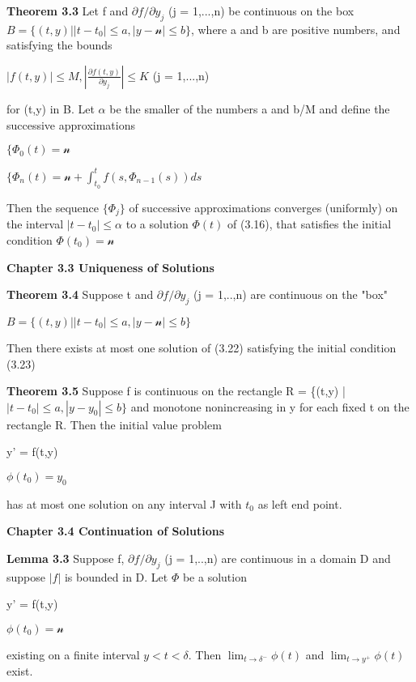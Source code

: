 \documentclass{article}
\newcommand\tab[1][1cm]{\hspace*{#1}}
\begin{document}
\textbf {Theorem 3.3} Let f and $\partial f / \partial y_j$ (j = 1,...,n) be 
continuous on the box $B = \{ (t,y) | |t-t_0| \leq a, |y-\mathcal{n}| \leq b \}$,
where a and b are positive numbers, and satisfying the bounds
\begin{center}
$|f(t,y)| \leq M, |\frac{\partial f(t,y)}{\partial y_j} | \leq K$ \tab (j = 1,...,n)
\end{center}
for (t,y) in B. Let $\alpha$ be the smaller of the numbers a and b/M and define
the successive approximations
\begin{center}
$ \{ \Phi_0(t) = \mathscr{n}$
\end{center}
\begin{center}
$ \{ \Phi_n(t) = \mathscr{n} + \int_{t_0}^t f(s, \Phi_{n-1} (s)) ds$
\end{center}
Then the sequence $\{ \Phi_j \}$ of successive approximations converges 
(uniformly) on the interval $|t-t_0| \leq \alpha$ to a solution $\Phi(t)$ of (3.16), 
that satisfies the initial condition $\Phi(t_0) = \mathscr{n}$

\textbf {Chapter 3.3 Uniqueness of Solutions}

\textbf {Theorem 3.4} Suppose t and $\partial f / \partial y_j$ (j = 1,..,n) are continuous on the "box"
\begin{center}
$B = \{(t,y) | |t-t_0| \leq a, |y-\mathscr{n}| \leq b \}$
\end{center}
Then there exists at most one solution of (3.22) satisfying the initial condition (3.23)

\textbf {Theorem 3.5} Suppose f is continuous on the rectangle R = \{(t,y) | $ |t-t_0| \leq a, |y-y_0| \leq b \}$ and monotone nonincreasing in y for each fixed t on the rectangle R. Then the initial value problem
\begin{center}
y' = f(t,y)
\end{center}
\begin{center}
$\phi(t_0) = y_0$
\end{center}
has at most one solution on any interval J with $t_0$ as left end point.

\textbf {Chapter 3.4 Continuation of Solutions}

\textbf {Lemma 3.3} Suppose f, $\partial f / \partial y_j$ (j = 1,..,n) are continuous in a domain D and suppose $|f|$ is bounded in D. Let $\Phi$ be a solution
\begin{center}
y' = f(t,y)
\end{center}
\begin{center}
$\phi(t_0) = \mathscr{n}$
\end{center}
existing on a finite interval $y < t < \delta$. Then $\lim_{t \to \delta^-} \phi(t)$ and $\lim_{t \to y^+} \phi(t)$ exist.
\end{document}
